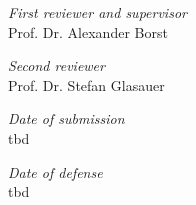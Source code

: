 \hfill

\vfill

\textit{First reviewer and supervisor} \\
Prof. Dr. Alexander Borst

\bigskip

\textit{Second reviewer} \\
Prof. Dr. Stefan Glasauer

\bigskip

\textit{Date of submission} \\
tbd

\bigskip

\textit{Date of defense} \\
tbd